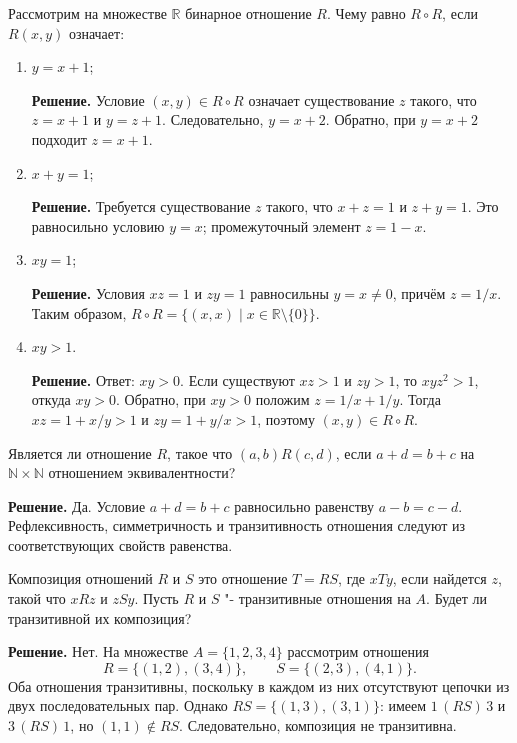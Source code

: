 \begin{problems}
\item Рассмотрим на множестве $\mathbb{R}$ бинарное отношение $R$. Чему равно $R\circ R$, если $R(x,y)$ означает:
\begin{enumerate}[label=\alph*)]
  \item $y=x+1$;
  \par\smallskip\noindent\textbf{Решение.} Условие $(x,y)\in R\circ R$ означает существование $z$ такого, что $z=x+1$ и $y=z+1$. Следовательно, $y=x+2$. Обратно, при $y=x+2$ подходит $z=x+1$.\par
  \item $x+y=1$;
  \par\smallskip\noindent\textbf{Решение.} Требуется существование $z$ такого, что $x+z=1$ и $z+y=1$. Это равносильно условию $y=x$; промежуточный элемент $z=1-x$.\par
  \item $xy=1$;
  \par\smallskip\noindent\textbf{Решение.} Условия $xz=1$ и $zy=1$ равносильны $y=x\ne0$, причём $z=1/x$. Таким образом, $R\circ R=\{(x,x)\mid x\in\mathbb R\setminus\{0\}\}$.\par
  \item $xy>1$.
  \par\smallskip\noindent\textbf{Решение.} Ответ: $xy>0$. Если существуют $xz>1$ и $zy>1$, то $xyz^2>1$, откуда $xy>0$. Обратно, при $xy>0$ положим $z=1/x+1/y$. Тогда $xz=1+x/y>1$ и $zy=1+y/x>1$, поэтому $(x,y)\in R\circ R$.\par
\end{enumerate}

\item Является ли отношение $R$, такое что $(a,b)R(c,d)$, если $a+d=b+c$ на $\mathbb{N}\times\mathbb{N}$ отношением эквивалентности?
\par\smallskip\noindent\textbf{Решение.} Да. Условие $a+d=b+c$ равносильно равенству $a-b=c-d$. Рефлексивность, симметричность и транзитивность отношения следуют из соответствующих свойств равенства.\par

\item Композиция отношений $R$ и $S$ это отношение $T=RS$, где $xTy$, если найдется $z$, такой что $xRz$ и $zSy$. Пусть $R$ и $S$ "- транзитивные отношения на $A$. Будет ли транзитивной их композиция?
\par\smallskip\noindent\textbf{Решение.} Нет. На множестве $A=\{1,2,3,4\}$ рассмотрим отношения
\[
R=\{(1,2),(3,4)\},\qquad S=\{(2,3),(4,1)\}.
\]
Оба отношения транзитивны, поскольку в каждом из них отсутствуют цепочки из двух последовательных пар. Однако $RS=\{(1,3),(3,1)\}$: имеем $1\,(RS)\,3$ и $3\,(RS)\,1$, но $(1,1)\notin RS$. Следовательно, композиция не транзитивна.\par


\end{problems}
